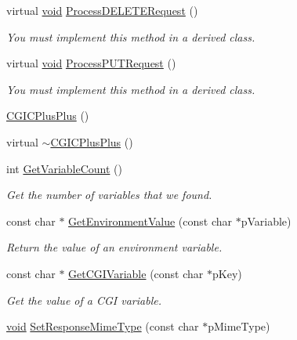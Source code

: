 \begin{DoxyCompactItemize}
virtual \hyperlink{_cpclient_8h_a6464f7480a0fd0ee170cba12b2c0497f}{void} \hyperlink{class_c_g_i_c_plus_plus_a86c58f739d561752f70330f321a5351b}{\-Process\-D\-E\-L\-E\-T\-E\-Request} ()
\begin{DoxyCompactList}\small\item\em \-You must implement this method in a derived class. \end{DoxyCompactList}\item 
virtual \hyperlink{_cpclient_8h_a6464f7480a0fd0ee170cba12b2c0497f}{void} \hyperlink{class_c_g_i_c_plus_plus_af903fb45e8aea8b38d2d5f49b59c8e47}{\-Process\-P\-U\-T\-Request} ()
\begin{DoxyCompactList}\small\item\em \-You must implement this method in a derived class. \end{DoxyCompactList}\item 
\hyperlink{class_c_g_i_c_plus_plus_a9fca234b02a37170066c13e139cf304c}{\-C\-G\-I\-C\-Plus\-Plus} ()
\item 
virtual \hyperlink{class_c_g_i_c_plus_plus_a908b30bdf28a2050775727046e5db7b4}{$\sim$\-C\-G\-I\-C\-Plus\-Plus} ()
\item 
int \hyperlink{class_c_g_i_c_plus_plus_a53a8d30eb76e65d6da90c804dea755dc}{\-Get\-Variable\-Count} ()
\begin{DoxyCompactList}\small\item\em \-Get the number of variables that we found. \end{DoxyCompactList}\item 
const char $\ast$ \hyperlink{class_c_g_i_c_plus_plus_a02f0d93c958335a894ab723ca8491ac0}{\-Get\-Environment\-Value} (const char $\ast$p\-Variable)
\begin{DoxyCompactList}\small\item\em \-Return the value of an environment variable. \end{DoxyCompactList}\item 
const char $\ast$ \hyperlink{class_c_g_i_c_plus_plus_a9ebd4e6761873133a6d1ca312a63bf33}{\-Get\-C\-G\-I\-Variable} (const char $\ast$p\-Key)
\begin{DoxyCompactList}\small\item\em \-Get the value of a \-C\-G\-I variable. \end{DoxyCompactList}\item 
\hyperlink{_cpclient_8h_a6464f7480a0fd0ee170cba12b2c0497f}{void} \hyperlink{class_c_g_i_c_plus_plus_a715711e9f674fff734a64120c5600ab2}{\-Set\-Response\-Mime\-Type} (const char $\ast$p\-Mime\-Type)

\end{DoxyCompactItemize}
